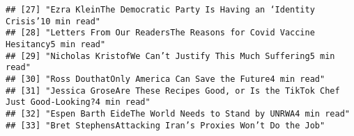 \documentclass[
]{article}
\begin{document}
\begin{verbatim}
## [27] "Ezra KleinThe Democratic Party Is Having an ‘Identity Crisis’10 min read"                                                                                                                                                                                                                                                                                                                                             
## [28] "Letters From Our ReadersThe Reasons for Covid Vaccine Hesitancy5 min read"                                                                                                                                                                                                                                                                                                                                            
## [29] "Nicholas KristofWe Can’t Justify This Much Suffering5 min read"                                                                                                                                                                                                                                                                                                                                                       
## [30] "Ross DouthatOnly America Can Save the Future4 min read"                                                                                                                                                                                                                                                                                                                                                               
## [31] "Jessica GroseAre These Recipes Good, or Is the TikTok Chef Just Good-Looking?4 min read"                                                                                                                                                                                                                                                                                                                              
## [32] "Espen Barth EideThe World Needs to Stand by UNRWA4 min read"                                                                                                                                                                                                                                                                                                                                                          
## [33] "Bret StephensAttacking Iran’s Proxies Won’t Do the Job"                                                                                                                                                                                                                                                                                                                                                               

\end{verbatim}
\end{document}
